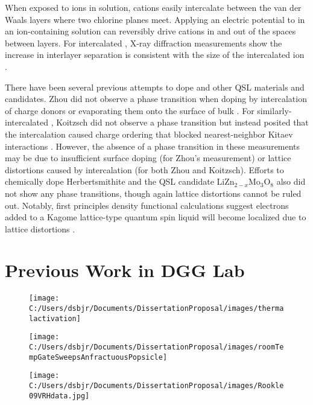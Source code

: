 \documentclass[11pt]{article}
\begin{document}
When exposed to ions in solution, cations easily intercalate between the van der Waals layers where two chlorine planes meet. Applying an electric potential to \rucl in an ion-containing solution can reversibly drive cations in and out of the spaces between layers. For intercalated \rucl, X-ray diffraction measurements show the increase in interlayer separation is consistent with the size of the intercalated ion \cite{Steffen1986,Schollhorn1983}.

There have been several previous attempts to dope \rucl and other QSL materials and candidates. Zhou did not observe a phase transition when doping \rucl by intercalation of charge donors or evaporating them onto the surface of bulk \rucl \cite{Zhou2016}. For similarly-intercalated \ruclnospace , Koitzsch did not observe a phase transition but instead posited that the intercalation caused charge ordering that blocked nearest-neighbor Kitaev interactions \cite{Koitzsch2017a}. However, the absence of a phase transition in these measurements may be due to insufficient surface doping (for Zhou's measurement) or lattice distortions caused by intercalation (for both Zhou and Koitzsch). Efforts to chemically dope Herbertsmithite \cite{Kelly2016} and the QSL candidate LiZn$_{2-x}$Mo$_{3}$O$_{8}$ \cite{Sheckelton2015} also did not show any phase transitions, though again lattice distortions cannot be ruled out. Notably, first principles density functional calculations suggest electrons added to a Kagome lattice-type quantum spin liquid will become localized due to lattice distortions \cite{Liu2018}.

\section{Previous Work in DGG Lab}

\begin{figure}
\centering
\begin{minipage}{0.3\textwidth}
\centering 
  {\texttt{[image: C:/Users/dsbjr/Documents/DissertationProposal/images/thermalactivation]}\label{fig:f2}}
  \captionsetup{width=0.9\textwidth}
\end{minipage}%
\begin{minipage}{0.3\textwidth}
\centering
  {\texttt{[image: C:/Users/dsbjr/Documents/DissertationProposal/images/roomTempGateSweepsAnfractuousPopsicle]}\label{fig:f1}}
  \captionsetup{width=0.9\textwidth}
\end{minipage}%
\begin{minipage}{0.3\textwidth}
\centering
	{\texttt{[image: C:/Users/dsbjr/Documents/DissertationProposal/images/Rookle09VRHdata.jpg]}\label{fig:f3}}
	\captionsetup{width=0.9\textwidth}
\end{minipage}
\end{figure}
\end{document}
